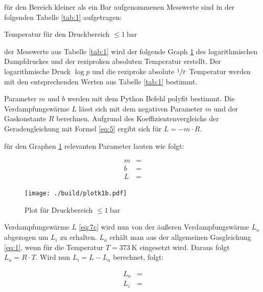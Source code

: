 \justifying für den Bereich kleiner als ein Bar aufgenommenen Messwerte sind in der folgenden Tabelle \ref{tab:1} aufgetragen:

\begin{table}
    \centering
    
    \caption{Temperatur für den Druckbereich $\leq \SI{1}{\bar}$}
    \label{tab:1}
\end{table}

\justifying der Messwerte aus Tabelle \ref{tab:1} wird der folgende Graph \ref{fig:4} des logarithmischen Dampfdruckes und
der reziproken absoluten Temperatur erstellt. Der logarithmische Druck $\log{p}$ und die reziproke absolute $\sfrac{1}{T}$ 
Temperatur werden mit den entsprechenden Werten aus Tabelle \ref{tab:1} bestimmt.
\newpage

\justifying Parameter $m$ und $b$ werden mit dem Python Befehl polyfit \cite{uncertainties} bestimmt. Die Verdampfungswärme $L$ lässt sich mit dem 
negativen Parameter $m$ und der Gaskonstante $R$ berechnen. Aufgrund des Koeffizientenvergleichs der Geradengleichung mit Formel \eqref{eq:5}
ergibt sich für $L = -m \cdot R$.

\justifying für den Graphen \ref{fig:4} relevanten Parameter lauten wie folgt:

\begin{subequations} \label{eq:7}
\begin{align}
    m &= \text{} \label{eq:7a}\\
    b &= \text{} \label{eq:7b}\\
    L &= \text{} \label{eq:7c}
\end{align}
\end{subequations}

\begin{figure}[H]
    \centering
    \texttt{[image: ./build/plotk1b.pdf]}
    \caption{Plot für Druckbereich $\leq \SI{1}{\bar}$}
    \label{fig:4}
\end{figure}

\justifying Verdampfungswärme $L$ \eqref{eq:7c} wird nun von der äußeren Verdampfungswärme $L_a$ abgezogen um $L_i$ zu 
erhalten. $L_a$ erhält man aus der allgemeinen Gasgleichung \eqref{eq:1}, wenn für die Temperatur $T = \SI{373}{\kelvin}$ eingesetzt wird. 
Daraus folgt $L_a = R \cdot T$. Wird nun $L_i = L - L_a$ berechnet, folgt:

\begin{subequations} \label{eq:8}
\begin{align}
    L_a &= \text{} \label{eq:8a}\\
    L_i &= \text{} \label{eq:8b}
\end{align}
\end{subequations}

